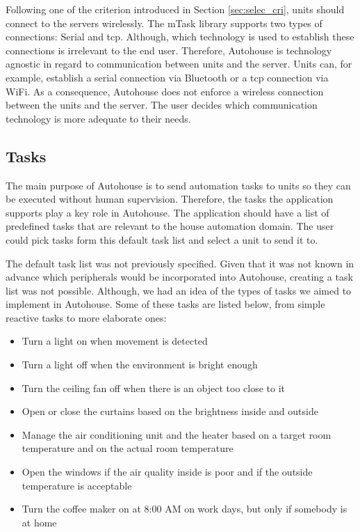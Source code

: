 Following one of the criterion introduced in Section \ref{sec:selec_cri}, units should connect to the servers wirelessly. The \gls{mTask} library supports two types of connections: Serial and \acs{tcp}. Although, which technology is used to establish these connections is irrelevant to the end user. Therefore, Autohouse is technology agnostic in regard to communication between units and the server. Units can, for example, establish a serial connection via Bluetooth or a \acs{tcp} connection via WiFi. As a consequence, Autohouse does not enforce a wireless connection between the units and the server. The user decides which communication technology is more adequate to their needs.

\subsection{Tasks}

The main purpose of Autohouse is to send automation tasks to units so they can be executed without human supervision. Therefore, the tasks the application supports play a key role in Autohouse. The application should have a list of predefined tasks that are relevant to the house automation domain. The user could pick tasks form this default task list and select a unit to send it to.

The default task list was not previously specified. Given that it was not known in advance which peripherals would be incorporated into Autohouse, creating a task list was not possible. Although, we had an idea of the types of tasks we aimed to implement in Autohouse. Some of these tasks are listed below, from simple reactive tasks to more elaborate ones:

\begin{itemize}
    \item Turn a light on when movement is detected
    \item Turn a light off when the environment is bright enough
    \item Turn the ceiling fan off when there is an object too close to it
    \item Open or close the curtains based on the brightness inside and outside
    \item Manage the air conditioning unit and the heater based on a target room temperature and on the actual room temperature
    \item Open the windows if the air quality inside is poor and if the outside temperature is acceptable
    \item Turn the coffee maker on at 8:00 AM on work days, but only if somebody is at home
\end{itemize}

